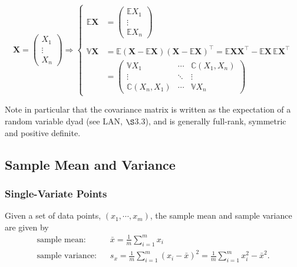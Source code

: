 \documentclass[12pt, twoside, draft]{article}
\begin{document}
\begin{equation}
\mathbf{X} = \begin{pmatrix} X_1 \\ \vdots \\ X_n \end{pmatrix} \Rightarrow
\begin{cases}
\mathbb{E}\mathbf{X} &= \begin{pmatrix} \mathbb{E}X_1 \\ \vdots \\ \mathbb{E}X_n \end{pmatrix}    \\
\\
\mathbb{V}\mathbf{X} &= \mathbb{E}(\mathbf{X} - \mathbb{E}\mathbf{X})(\mathbf{X} - \mathbb{E}\mathbf{X})^\top = \mathbb{E}\mathbf{X} \mathbf{X}^\top - \mathbb{E}\mathbf{X} \, \mathbb{E}\mathbf{X}^\top \\
&=\begin{pmatrix}
\mathbb{V}X_1 & \cdots & \mathbb{C}(X_1, X_n) \\
\vdots & \ddots & \vdots \\
\mathbb{C}(X_n, X_1) & \cdots & \mathbb{V}X_n
\end{pmatrix}
\end{cases}
\end{equation}

Note in particular that the covariance matrix is written as the expectation of a random variable dyad (see LAN, $\S$3.3), and is generally full-rank, symmetric and positive definite.

\subsection{Sample Mean and Variance}\label{sec:sample_mean_variance}
\subsubsection{Single-Variate Points}\label{sec:sample_mean_variance_single-variate}
Given a set of data points, $(x_1, \cdots, x_m)$, the sample mean and sample variance are given by
\begin{align}
\text{sample mean:} \hspace{10pt} & \bar{x} = \frac{1}{m} \sum_{i=1}^m x_i \label{eq:sample_mean}\\
\text{sample variance:} \hspace{10pt} & s_x = \frac{1}{m} \sum_{i=1}^m (x_i - \bar{x})^2 = \frac{1}{m} \sum_{i=1}^m x^2_i - \bar{x}^2. \label{eq:sample_variance}
\end{align}
\end{document}
